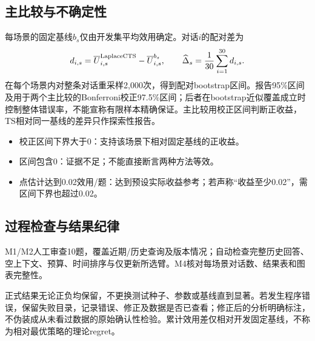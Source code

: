 \documentclass[11pt,a4paper]{article}
\begin{document}
\subsection{主比较与不确定性}
每场景的固定基线$b_s$仅由开发集平均效用确定。对话$i$的配对差为
\[
d_{i,s}=\overline U_{i,s}^{\rm LaplaceCTS}-\overline U_{i,s}^{b_s},
\qquad \widehat\Delta_s=\frac1{30}\sum_{i=1}^{30}d_{i,s}.
\]
在每个场景内对整条对话重采样2,000次，得到配对bootstrap区间。报告95\%区间及用于两个主比较的Bonferroni校正97.5\%区间；后者在bootstrap近似覆盖成立时控制整体错误率，不能宣称有限样本精确保证。主比较用校正区间判断正收益，TS相对同一基线的差异只作探索性报告。

\begin{itemize}
\item 校正区间下界大于0：支持该场景下相对固定基线的正收益。
\item 区间包含0：证据不足；不能直接断言两种方法等效。
\item 点估计达到0.02效用/题：达到预设实际收益参考；若声称“收益至少0.02”，需区间下界也超过0.02。
\end{itemize}

\subsection{过程检查与结果纪律}
M1/M2人工审查10题，覆盖近期/历史查询及版本情况；自动检查完整历史回答、空上下文、预算、时间排序与仅更新所选臂。M4核对每场景对话数、结果表和图表完整性。

正式结果无论正负均保留，不更换测试种子、参数或基线直到显著。若发生程序错误，保留失败目录，记录错误、修正及数据是否已查看；修正后的分析明确标注，不伪装成从未看过数据的原始确认性检验。累计效用差仅相对开发固定基线，不称为相对最优策略的理论regret。
\end{document}
